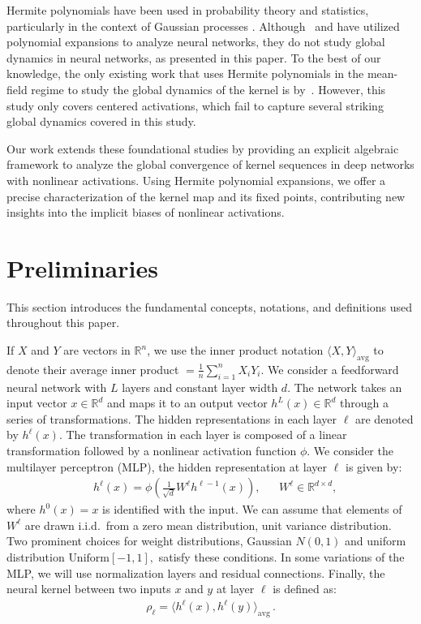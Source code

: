 \documentclass[twoside]{article}
\newcommand{\avg}{\text{avg}}
\newcommand{\R}{\mathbb{R}}
\theoremstyle{definition}
\begin{document}
Hermite polynomials have been used in probability theory and statistics, particularly in the context of Gaussian processes \citep{williams2006gaussian}. Although~\citet{poole2016exponential} and \citet{daniely2016toward} have utilized polynomial expansions to analyze neural networks, they do not study global dynamics in neural networks, as presented in this paper. To the best of our knowledge, the only existing work that uses Hermite polynomials in the mean-field regime to study the global dynamics of the kernel is by~\citet{joudaki2023impact}. However, this study only covers centered activations, which fail to capture several striking global dynamics covered in this study.

Our work extends these foundational studies by providing an explicit algebraic framework to analyze the global convergence of kernel sequences in deep networks with nonlinear activations. Using Hermite polynomial expansions, we offer a precise characterization of the kernel map and its fixed points, contributing new insights into the implicit biases of nonlinear activations.

\section{Preliminaries}
This section introduces the fundamental concepts, notations, and definitions used throughout this paper. 

If $X$ and $Y$ are vectors in $\R^n$, we use the inner product notation $\langle X, Y \rangle_\avg$ to denote their average inner product $ = \frac{1}{n} \sum_{i=1}^n X_i Y_i.$  We consider a feedforward neural network with $L$ layers and constant layer width $d$. The network takes an input vector $x \in \R^d$ and maps it to an output vector $h^L(x) \in \R^d$ through a series of transformations. The hidden representations in each layer $\ell$ are denoted by $h^\ell(x)$. The transformation in each layer is composed of a linear transformation followed by a nonlinear activation function $\phi$. We consider the multilayer perceptron (MLP), the hidden representation at layer $\ell$ is given by:
\begin{align}
& h^\ell(x) = \phi\left(\frac{1}{\sqrt{d}}W^\ell h^{\ell-1}(x)\right), && W^\ell \in \R^{d \times d},
\end{align}
where $h^0(x)=x$ is identified with the input. We can assume that elements of $W^\ell$ are drawn i.i.d.~from a zero mean distribution, unit variance distribution. Two prominent choices for weight distributions, Gaussian $N(0,1)$ and uniform distribution $\text{Uniform}[-1,1],$ satisfy these conditions. In some variations of the MLP, we will use normalization layers and residual connections. Finally, the neural kernel between two inputs $x$ and $y$ at layer $\ell$ is defined as:
\begin{align}
    \rho_\ell = \langle h^\ell(x), h^\ell(y) \rangle_\avg \,.
\end{align}
\end{document}
